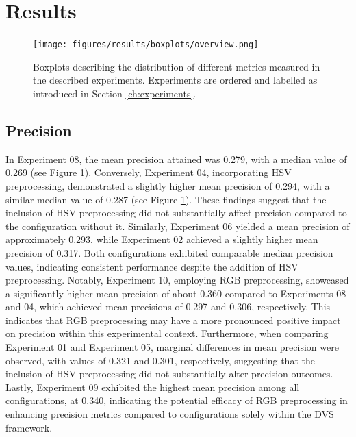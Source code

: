 \documentclass[sigchi,screen]{acmart}
\begin{document}
\section{Results}
\begin{figure}
    \centering
    \texttt{[image: figures/results/boxplots/overview.png]}
    \caption{Boxplots describing the distribution of different metrics measured in the described experiments. Experiments are ordered and labelled as introduced in Section \ref{ch:experiments}.}
    \label{fig:results:overview}
\end{figure}


\subsection{Precision}
In Experiment 08, the mean precision attained was 0.279, with a median value of 0.269 (see Figure \ref{fig:results:overview}). Conversely, Experiment 04, incorporating HSV preprocessing, demonstrated a slightly higher mean precision of 0.294, with a similar median value of 0.287 (see Figure \ref{fig:results:overview}). These findings suggest that the inclusion of HSV preprocessing did not substantially affect precision compared to the configuration without it. Similarly, Experiment 06 yielded a mean precision of approximately 0.293, while Experiment 02 achieved a slightly higher mean precision of 0.317. Both configurations exhibited comparable median precision values, indicating consistent performance despite the addition of HSV preprocessing. Notably, Experiment 10, employing RGB preprocessing, showcased a significantly higher mean precision of about 0.360 compared to Experiments 08 and 04, which achieved mean precisions of 0.297 and 0.306, respectively. This indicates that RGB preprocessing may have a more pronounced positive impact on precision within this experimental context. Furthermore, when comparing Experiment 01 and Experiment 05, marginal differences in mean precision were observed, with values of 0.321 and 0.301, respectively, suggesting that the inclusion of HSV preprocessing did not substantially alter precision outcomes. Lastly, Experiment 09 exhibited the highest mean precision among all configurations, at 0.340, indicating the potential efficacy of RGB preprocessing in enhancing precision metrics compared to configurations solely within the DVS framework.
\end{document}
